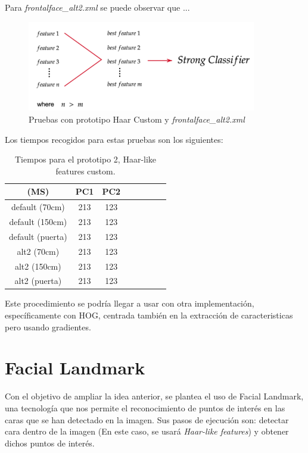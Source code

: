 Para \textit{frontalface\_alt2.xml} se puede observar que ...

\begin{figure}[htp]
	\centering
	\includegraphics[width=10cm]{imagenes/ada1.png}
	\caption{Pruebas con prototipo Haar Custom y \textit{frontalface\_alt2.xml}}
	\label{fig:haarCustom2}
\end{figure}

Los tiempos recogidos para estas pruebas son los siguientes:

\begin{table}[h!]
	\begin{center}
		\begin{tabular}{ |c|c|c|c|c|c|c|c| } 
			\hline
			(MS) & PC1 & PC2 \\
			\hline
			default (70cm) & 213  & 123  \\
			\hline
			default (150cm) & 213  & 123 \\
			\hline
			default (puerta) & 213  & 123 \\
			\hline
			alt2 (70cm) & 213  & 123  \\
			\hline
			alt2 (150cm) & 213  & 123 \\
			\hline
			alt2 (puerta) & 213  & 123 \\
			\hline
		\end{tabular}
		\caption{Tiempos para el prototipo 2, Haar-like features custom.}
		\label{tab:table3}
	\end{center}
\end{table}

Este procedimiento se podría llegar a usar con otra implementación, específicamente con HOG, centrada también en la extracción de caracteristicas pero usando gradientes.

\newpage
\section{Facial Landmark}

Con el objetivo de ampliar la idea anterior, se plantea el uso de Facial Landmark, una tecnología que nos permite el reconocimiento de puntos de interés en las caras que se han detectado en la imagen. Sus pasos de ejecución son: detectar cara dentro de la imagen (En este caso, se usará \textit{Haar-like features}) y obtener dichos puntos de interés.

